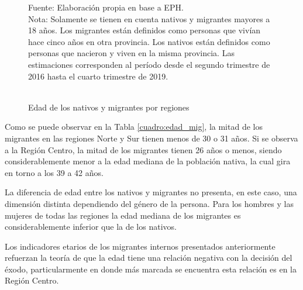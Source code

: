 \documentclass[12pt,a4paper]{article}
\begin{document}
\begin{figure}[ht!]
\begin{center}
\caption{\\Edad de los nativos y migrantes por regiones}
 
\label{figure:edad_mig}
\begin{flushleft}
\begin{scriptsize}
Fuente: Elaboración propia en base a EPH.\\
Nota: Solamente se tienen en cuenta nativos y migrantes mayores a 18 años. Los migrantes están definidos como personas que vivían hace cinco años en otra provincia. Los nativos están definidos como personas que nacieron y viven en la misma provincia. Las estimaciones corresponden al período desde el segundo trimestre de 2016 hasta el cuarto trimestre de 2019.\\
\end{scriptsize}
\end{flushleft}
\end{center}
\end{figure}

\newpage
Como se puede observar en la Tabla \ref{cuadro:edad_mig}, la mitad de los migrantes en las regiones Norte y Sur tienen menos de 30 o 31 años. Si se observa a la Región Centro, la mitad de los migrantes tienen 26 años o menos, siendo considerablemente menor a la edad mediana de la población nativa, la cual gira en torno a los 39 a 42 años.

La diferencia de edad entre los nativos y migrantes no presenta, en este caso, una dimensión distinta dependiendo del género de la persona. Para los hombres y las mujeres de todas las regiones la edad mediana de los migrantes es considerablemente inferior que la de los nativos. 

Los indicadores etarios de los migrantes internos presentados anteriormente refuerzan la teoría de que la edad tiene una relación negativa con la decisión del éxodo, particularmente en donde más marcada se encuentra esta relación es en la Región Centro.
\end{document}
